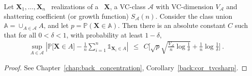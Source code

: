 

\begin{theorem}
\label{colt:thm-princ} 
Let $\mathbf{X}_1,\ldots,\mathbf{X}_n$ \iid~realizations of a \rv~$\mathbf{X}$, a VC-class $\mathcal{A}$ with VC-dimension $V_{\mathcal{A}}$ and shattering coefficient (or growth function) $S_{\mathcal{A}}(n)$.
Consider the class union $\mathbb{A} = \cup_{A \in \mathcal{A}} A$,
 and let  
$p = \mathbb{P}(\mathbf{X} \in \mathbb{A})$. Then there is an absolute constant $C$ such that for all $0<\delta<1$, with probability at least $1-\delta$,
\begin{align}
\label{colt:thm-princ-ineq}
\sup_{A \in \mathcal{A}} \left| \mathbb{P} \big[\mathbf{X} \in A\big] - \frac{1}{n} \sum_{i=1}^n \mathds{1}_{\mathbf{X}_i \in A}  \right| ~~\le~~ C \bigg[ \sqrt{p}\sqrt{\frac{V_{\mathcal{A}}}{n} \log{\frac{1}{\delta}}} + \frac{1}{n} \log{\frac{1}{\delta}} \bigg]~.
\end{align}
\end{theorem}

\begin{proof}
See Chapter~\ref{chap:back_concentration}, Corollary~\ref{back:cor_tvcsharp}.
\end{proof}

